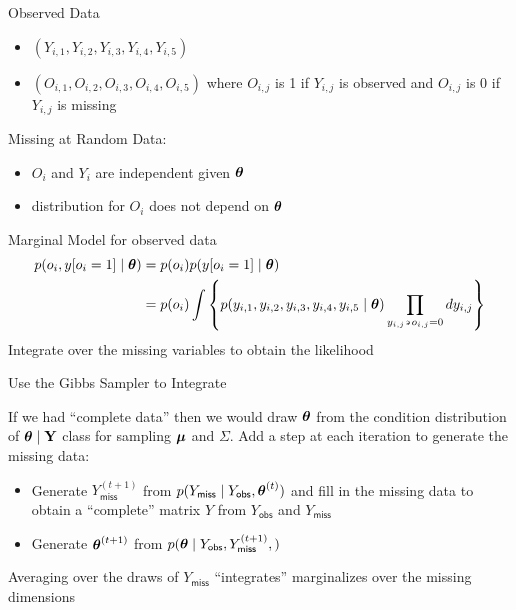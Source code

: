 \documentclass[]{beamer}\usepackage[]{graphicx}\usepackage[]{color}
\begin{document}
\begin{frame}{Observed Data}
  \begin{itemize}
  \item $(Y_{i,1}, Y_{i,2},  Y_{i,3},  Y_{i,4},  Y_{i,5})$
  \item $(O_{i,1}, O_{i,2},  O_{i,3},  O_{i,4},  O_{i,5})$  \pause
where $O_{i,j}$ is 1 if $Y_{i,j}$ is observed and $O_{i,j}$ is 0 if $Y_{i,j}$ is missing  \pause
  \end{itemize}
Missing at Random Data:
\begin{itemize}
\item $O_i$ and $Y_i$ are independent given $\boldsymbol{\theta}$  \pause
\item distribution for $O_i$ does not depend on  $\boldsymbol{\theta}$  \pause
\end{itemize}
Marginal Model for observed data
\begin{align*}
p(o_i, y[o_i = 1] \mid \boldsymbol{\theta}) &= p(o_i) p(y[o_i = 1] \mid \boldsymbol{\theta}) \\
  & = p(o_i) \int \left\{ p(y_{i,1}, y_{i,2}, y_{i,3}, y_{i,4}, y_{i,5} \mid \boldsymbol{\theta})
  \prod_{y_{i,j} \backepsilon \, o_{i,j} = 0} dy_{i,j} \right\}
\end{align*}
 \pause
Integrate over the missing variables to obtain the likelihood
\end{frame}

\begin{frame}{Use the Gibbs Sampler  to Integrate}

If we had ``complete data'' then we would draw  $\boldsymbol{\theta}$ from the condition distribution of $\boldsymbol{\theta} \mid \mathbf{Y}$
  class for sampling $\boldsymbol{\mu}$ and $\Sigma$. Add a step at each iteration to generate the missing data:
 \pause
 \begin{itemize}
  \item Generate  $Y_{\textsf{miss}}^{(t+1)}$
  from   $p(Y_{\textsf{miss}} \mid Y_{\textsf{obs}}, \boldsymbol{\theta}^{(t)})$
 and fill in the missing data to obtain a
  ``complete'' matrix $Y$  from $ Y_{\textsf{obs}}$ and  $Y_{\textsf{miss}}$  \pause
\item Generate $\boldsymbol{\theta}^{(t+1)}$ from  $p(\boldsymbol{\theta} \mid Y_{\textsf{obs}},
  Y_{\textsf{miss}}^{(t+1)},)$  \pause
  \end{itemize}
Averaging over the draws of $Y_{\textsf{miss}}$ ``integrates''
marginalizes over the missing dimensions
\end{frame}
\end{document}
